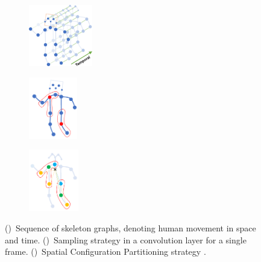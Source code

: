 \begin{figure}
    \centering
    \begin{subfigure}{.30\textwidth}
        \centering
        \includegraphics[height=2.7cm]{images/st_gcn_graph}
        \caption{}
        \label{fig:st-gcn-graph}
    \end{subfigure}
    \begin{subfigure}{.30\textwidth}
      \centering
      \includegraphics[height=2.7cm]{images/st_gcn_sampling}
      \caption{}
      \label{fig:st-gcn-sampling}
    \end{subfigure}
    \begin{subfigure}{.30\textwidth}
      \centering
      \includegraphics[height=2.7cm]{images/st_gcn_spatial_partitioning}
      \caption{}
      \label{fig:st-gcn-spatial-part}
    \end{subfigure}
    \caption{
        ()~Sequence of skeleton graphs, denoting human movement in space and time. 
        ()~Sampling strategy in a convolution layer for a single frame.
        ()~Spatial Configuration Partitioning strategy \cite{st-gcn-2018}.
    }
    \label{fig:graph_part_sampling}
\end{figure}    

\vspace{-5mm}   
    

